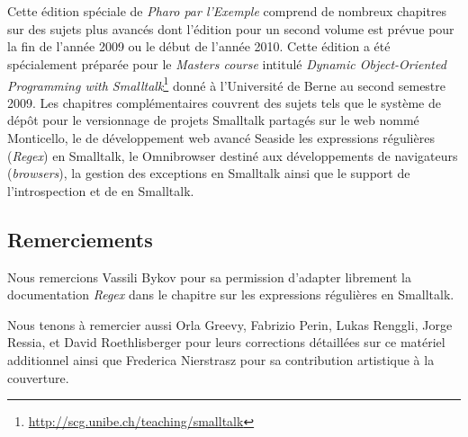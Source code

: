 \documentclass[a4paper,10pt,twoside]{book}
\begin{document}
	\sloppy
	\frontmatter
\fi
\chapter{}
\newcommand{\web}{web\xspace}

Cette édition spéciale de \emph{Pharo par l'Exemple} comprend de
nombreux chapitres sur des sujets plus avancés
dont l'édition pour un second volume est prévue pour la fin de l'année
2009 ou le début de l'année 2010.
Cette édition a été spécialement préparée pour le 
\emph{Masters course} intitulé \emph{Dynamic Object-Oriented
  Programming with
  Smalltalk}\footnote{\url{http://scg.unibe.ch/teaching/smalltalk}}
donné à l'Université de Berne au second semestre 2009.
Les chapitres complémentaires couvrent des sujets tels que le système
de dépôt pour le versionnage de projets Smalltalk partagés sur le \web
nommé Monticello,
le \framework de développement \web avancé Seaside%
les expressions régulières (\emph{Regex}) en Smalltalk,
le \framework Omnibrowser destiné aux développements de navigateurs
(\emph{browsers}),
la gestion des exceptions en Smalltalk ainsi que le support de
l'introspection et de  en Smalltalk.

\section*{Remerciements}

Nous remercions Vassili Bykov pour sa permission d'adapter librement
la documentation \emph{Regex} dans le chapitre sur les expressions
régulières en Smalltalk.

Nous tenons à remercier aussi
Orla Greevy,
Fabrizio Perin,
Lukas Renggli,
Jorge Ressia,
et
David Roethlisberger
pour leurs corrections détaillées sur ce matériel additionnel
ainsi que Frederica Nierstrasz pour sa contribution 
artistique à la couverture.




\ifx\wholebook\relax\else
   
   
\end{document}
